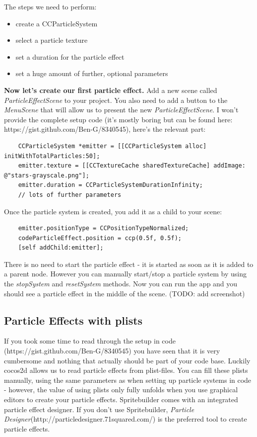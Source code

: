 \documentclass{scrreprt}
\newcommand{\cocos}{cocos2d}
\begin{document}
The steps we need to perform:
 \begin{itemize}
   \item create a CCParticleSystem
   \item select a particle texture
   \item set a duration for the particle effect
   \item set a huge amount of further, optional parameters
 \end{itemize}
\textbf{Now let's create our first particle effect.}
Add a new scene called \textit{ParticleEffectScene} to your project. You also
need to add a button to the \textit{MenuScene} that will allow us to present the
new \textit{ParticleEffectScene}.  
I won't provide the complete setup code (it's mostly
boring but can be found here: https://gist.github.com/Ben-G/8340545), here's the relevant part:
\begin{lstlisting}
    CCParticleSystem *emitter = [[CCParticleSystem alloc] initWithTotalParticles:50];
    emitter.texture = [[CCTextureCache sharedTextureCache] addImage: @"stars-grayscale.png"];
	emitter.duration = CCParticleSystemDurationInfinity;
    // lots of further parameters
\end{lstlisting}
Once the particle system is created, you add it as a child to your scene:
\begin{lstlisting}
    emitter.positionType = CCPositionTypeNormalized;
    codeParticleEffect.position = ccp(0.5f, 0.5f);
    [self addChild:emitter];
\end{lstlisting}
There is no need to start the particle effect - it is started as soon as it is
added to a parent node. However you can manually start/stop a particle system by
using the \textit{stopSystem} and \textit{resetSystem} methods. Now you can run
the app and you should see a particle effect in the middle of the scene. (TODO:
add screenshot) 
\subsection{Particle Effects with plists}
If you took some time to read through the setup in code
(https://gist.github.com/Ben-G/8340545) you have seen that it is very cumbersome
and nothing that actually should be part of your code base. Luckily \cocos{}
allows us to read particle effects from plist-files. You can fill these plists
manually, using the same parameters as when setting up particle systems in code
- however, the value of using plists only fully unfolds when you use graphical
editors to create your particle effects. Spritebuilder comes with an integrated
particle effect designer. If you don't use Spritebuilder, \textit{Particle
Designer}(http://particledesigner.71squared.com/) is the preferred tool to
create particle effects.
\end{document}
